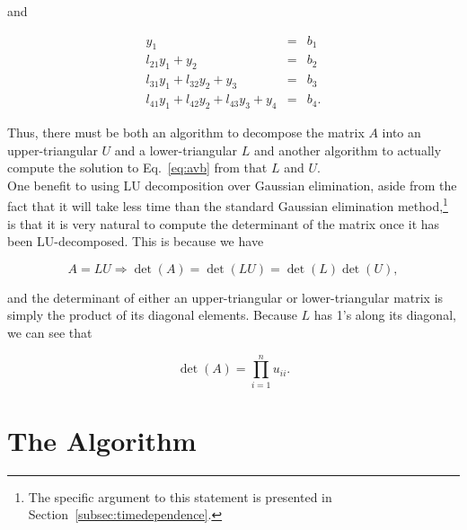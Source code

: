\documentclass[12pt]{article}
\numberwithin{equation}{section}
\begin{document}
\noindent and

$$\begin{array}{rcc}y_{1}&=&b_{1} \\
l_{21}y_{1}+y_{2}&=&b_{2} \\
l_{31}y_{1}+l_{32}y_{2}+y_{3}&=&b_{3} \\
l_{41}y_{1}+l_{42}y_{2}+l_{43}y_{3}+y_{4}&=&b_{4}.\end{array}$$

\noindent Thus, there must be both an algorithm to decompose the matrix $A$ into an upper-triangular $U$ and a lower-triangular $L$ and another algorithm to actually compute the solution to Eq.~\ref{eq:avb} from that $L$ and $U$.
\\\indent One benefit to using LU decomposition over Gaussian elimination, aside from the fact that it will take less time than the standard Gaussian elimination method,\footnote{The specific argument to this statement is presented in Section~\ref{subsec:timedependence}.}  is that it is very natural to compute the determinant of the matrix once it has been LU-decomposed.  This is because we have 

$$A=LU \Rightarrow \det\left(A\right)=\det\left(LU\right)=\det\left(L\right)\det\left(U\right),$$

\noindent and the determinant of either an upper-triangular or lower-triangular matrix is simply the product of its diagonal elements.  Because $L$ has 1's along its diagonal, we can see that

\begin{equation}
\det\left(A\right)=\prod_{i=1}^{n}u_{ii}.
\end{equation}

\section{The Algorithm}
\label{sec:algorithm}
\end{document}
